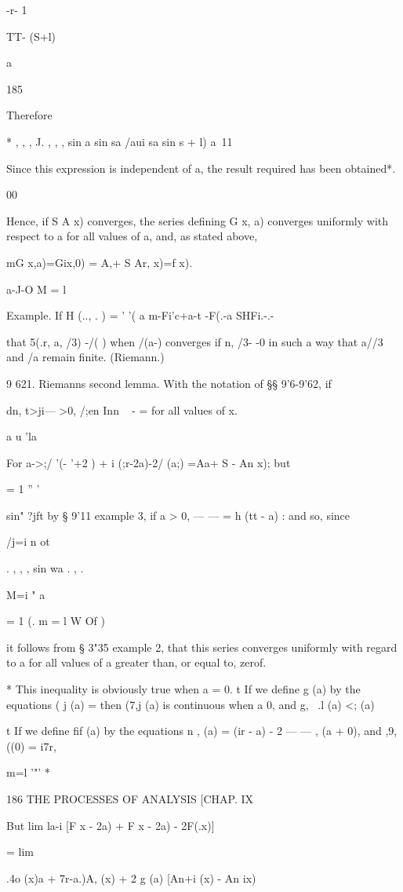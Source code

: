 -r- 1

 TT- (S+l)

a

185

Therefore

* , , , J. , , , sin a sin sa /aui sa sin s + l) a\ 11

Since this expression is independent of a, the result required has
been obtained*.

00

Hence, if S A x) converges, the series defining G x, a) converges
uniformly with respect to a for all values of a, and, as stated above,
\ \ {mG x,a)=Gix,0) = A,+ S Ar, x)=f x).

a-J-O M = l

Example. If H (.., . ) = ' '( a m-Fi'c+a-t -F(.-a SHFi.-.-

that 5(.r, a, /3) -/( ) when /(a-) converges if n, /3- -0 in such a
way that a//3 and /a remain finite. (Riemann.)

9 621. Riemanns second lemma. With the notation of §§ 9'6-9'62, if

dn, t>ji— >0, /;en Inn ~ - = for all values of x.

a u 'la

For a->;/ '(- '+2 ) + i (;r-2a)-2/ (a;) =Aa+ S - An x); but

  = 1 '' '

  sin" ?jft by § 9'11 example 3, if a > 0, — — = h (tt - a) : and so,
since

/j=i n ot

. , , , sin wa . , .

M=i " a

  = 1 (. m = l W Of )

it follows from § 3"35 example 2, that this series converges uniformly
with regard to a for all values of a greater than, or equal to, zerof.

* This inequality is obviously true when a = 0. t If we define g (a)
by the equations ( j (a) = then (7,j (a) is continuous when a 0, and
g, \ .l (a) <; (a)

t If we define fif (a) by the equations n , (a) = (ir - a) - 2 — — ,
(a + 0), and ,9,((0) = i7r,

m=l '"' *

186 THE PROCESSES OF ANALYSIS [CHAP. IX

But lim la-i [F x - 2a) + F x - 2a) - 2F(.x)]

= lim

.4o (x)a + 7r-a.)A, (x) + 2 g (a) [An+i (x) - An ix)

}
